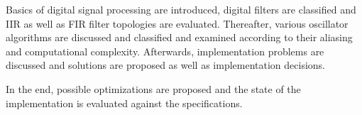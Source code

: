 Basics of digital signal processing are introduced, digital filters are classified and IIR as well as FIR filter topologies are evaluated.
Thereafter, various oscillator algorithms are discussed and classified and examined according to their aliasing and computational complexity.
Afterwards, implementation problems are discussed and solutions are proposed as well as implementation decisions.

In the end, possible optimizations are proposed and the state of the implementation is evaluated against the specifications.

\sffamily{
	\begin{center}
		\textbf{\documentAuthor{}}\\
		\textsc{\university{}}\\
		\universityFaculty{}---\universityDepartment{}\\
		\documentTitle{}\\
		\germanDate{}\today{}\\
		\bigskip{}
	\end{center}
}
